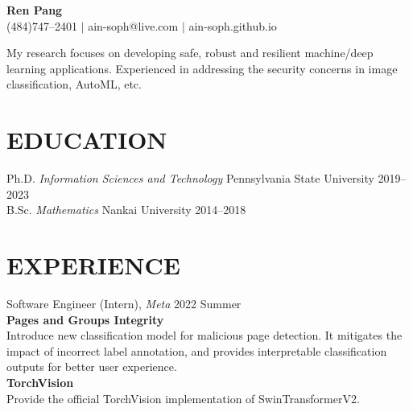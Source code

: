 \documentclass[letterpaper,11pt]{article}
\begin{document}
\begin{center}
    \textbf{\Huge Ren Pang} \\ \vspace{5pt}
    \small \faPhone* (484)747--2401 \hspace{1pt} $|$
    \hspace{1pt} \faEnvelope\hspace{2pt}ain-soph@live.com \hspace{1pt} $|$ 
    \hspace{1pt} \faGithub\hspace{2pt}ain-soph.github.io
    \\ \vspace{0pt}
\end{center}

\noindent
My research focuses on developing safe, robust and resilient machine/deep learning applications. Experienced in addressing the security concerns in image classification, AutoML, etc.

\section{EDUCATION}
Ph.D. \hspace{1em} \textit{Information Sciences and Technology} \hspace{1em} Pennsylvania State University \hfill 2019--2023 \\
B.Sc. \hspace{1em} \textit{Mathematics} \hspace{11.8em} Nankai University \hfill 2014--2018

\section{\textsc{EXPERIENCE}}
Software Engineer (Intern), \textit{Meta}  \hfill 2022 Summer\vspace{3pt}\\
\textbf{Pages and Groups Integrity}\\
Introduce new classification model for malicious page detection. It mitigates the impact of incorrect label annotation, and provides interpretable classification outputs for better user experience. \vspace{0.8em}\\
\textbf{TorchVision}\\
Provide the official TorchVision implementation of SwinTransformerV2.
\end{document}
